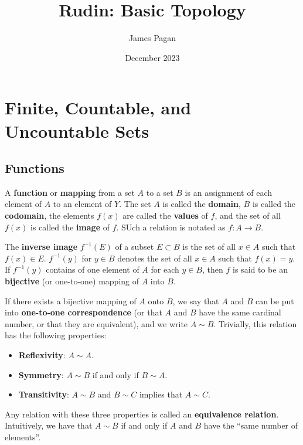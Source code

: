 \documentclass[11pt]{article}
\title{Rudin: Basic Topology}
\author{James Pagan}
\date{December 2023}
\begin{document}
\maketitle
\tableofcontents
\newpage


\section{Finite, Countable, and Uncountable Sets}


\subsection{Functions}

A \textbf{function} or \textbf{mapping} from a set $A$ to a set $B$ is an assignment of each element of $A$ to an element of $Y$. The set $A$ is called the \textbf{domain}, $B$ is called the \textbf{codomain}, the elements $f(x)$ are called the \textbf{values} of $f$, and the set of all $f(x)$ is called the \textbf{image} of $f$. SUch a relation is notated as $f : A \to B$.

The \textbf{inverse image} $f^{-1}(E)$ of a subset $E \subset B$ is the set of all $x \in A$ such that $f(x) \in E$. $f^{-1}(y)$ for $y \in B$ denotes the set of all $x \in A$ such that $f(x) = y$. If $f^{-1}(y)$ contains of one element of $A$ for each $y \in B$, then $f$ is said to be an \textbf{bijective} (or one-to-one) mapping of $A$ into $B$.

If there exists a bijective mapping of $A$ onto $B$, we say that $A$ and $B$ can be put into \textbf{one-to-one correspondence} (or that $A$ and $B$ have the same cardinal number, or that they are equivalent), and we write $A \sim B$. Trivially, this relation has the following properties:
\begin{itemize}
	\item \textbf{Reflexivity}: $A \sim A$.
	\item \textbf{Symmetry}: $A \sim B$ if and only if $B \sim A$.
	\item \textbf{Transitivity}: $A \sim B$ and $B \sim C$ implies that $A \sim C$.
\end{itemize}
Any relation with these three properties is called an \textbf{equivalence relation}. Intuitively, we have that $A \sim B$ if and only if $A$ and $B$ have the ``same number of elements''.
\end{document}
